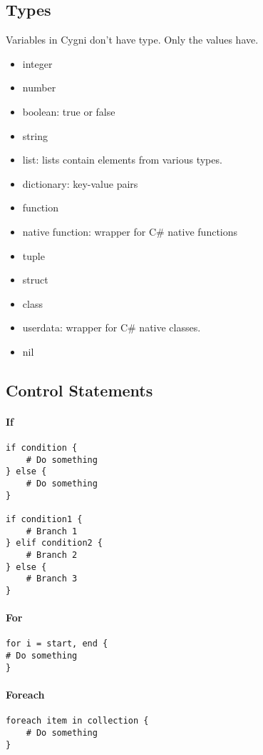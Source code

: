 \documentclass[]{article}
\begin{document}
\subsection{Types}
Variables in Cygni don't have type. Only the values have.
\begin{itemize}
	\item integer
	\item number
	\item boolean: true or false
	\item string
	\item list: lists contain elements from various types.
	\item dictionary: key-value pairs
	\item function
	\item native function: wrapper for C\# native functions
	\item tuple
	\item struct
	\item class
	\item userdata: wrapper for C\# native classes.
	\item nil
\end{itemize}

\subsection{Control Statements}
\paragraph{If}
\begin{lstlisting}
if condition {
	# Do something
} else {
	# Do something
}

if condition1 {
	# Branch 1
} elif condition2 {
	# Branch 2
} else {
	# Branch 3
}
\end{lstlisting}
\paragraph{For}
\begin{lstlisting}
for i = start, end {
# Do something
}
\end{lstlisting}
\paragraph{Foreach}
\begin{lstlisting}
foreach item in collection {
	# Do something
}
\end{lstlisting}
\end{document}
